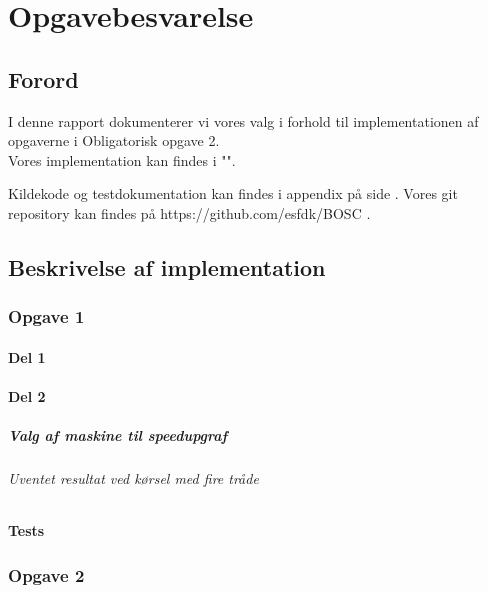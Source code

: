 \chapter{Opgavebesvarelse}
\section{Forord}
I denne rapport dokumenterer vi vores valg i forhold til implementationen af opgaverne i Obligatorisk opgave 2.
\\Vores implementation kan findes i "".

Kildekode og testdokumentation kan findes i appendix på side \pageref{Appendix}. Vores git repository kan findes på https://github.com/esfdk/BOSC .

\section{}

\section{Beskrivelse af implementation}
\subsection{Opgave 1}
\label{O1}

\subsubsection{Del 1}
\label{O1_1}

\subsubsection{Del 2}
\label{O1_2}

\paragraph{Valg af maskine til speedupgraf}

\subparagraph{Uventet resultat ved kørsel med fire tråde}

\subsubsection{Tests}
\label{O1_Tests}


\subsection{Opgave 2}
\label{O2}

